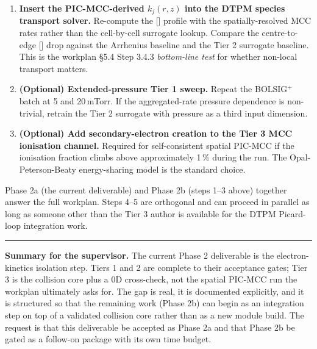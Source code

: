 \documentclass[11pt,a4paper]{article}
\begin{document}
\begin{enumerate}
        fluorine-profile validation. If the centre-to-edge drop
        changes by less than 2 percentage points, the Maxwellian
        Arrhenius baseline stands as adequate for the fluorine
        profile. If it changes by more than that, Tier 2 becomes
        the production kinetics module.
  \item \textbf{Insert the PIC-MCC-derived $k_j(r, z)$ into the
        DTPM species transport solver.} Re-compute the
        [] profile with the spatially-resolved MCC rates
        rather than the cell-by-cell surrogate lookup. Compare the
        centre-to-edge [] drop against the Arrhenius
        baseline and the Tier 2 surrogate baseline. This is the
        workplan §5.4 Step 3.4.3 \emph{bottom-line test} for
        whether non-local transport matters.
  \item \textbf{(Optional) Extended-pressure Tier 1 sweep.} Repeat
        the BOLSIG$^+$ batch at 5 and 20\,mTorr. If the
        aggregated-rate pressure dependence is non-trivial,
        retrain the Tier 2 surrogate with pressure as a third
        input dimension.
  \item \textbf{(Optional) Add secondary-electron creation to the
        Tier 3 MCC ionisation channel.} Required for
        self-consistent spatial PIC-MCC if the ionisation fraction
        climbs above approximately 1\,\% during the run. The
        Opal-Peterson-Beaty energy-sharing model is the standard
        choice.
\end{enumerate}

Phase 2a (the current deliverable) and Phase 2b (steps 1--3 above)
together answer the full workplan. Steps 4--5 are orthogonal and
can proceed in parallel as long as someone other than the Tier 3
author is available for the DTPM Picard-loop integration work.

\vspace{1em}
\hrule
\vspace{0.5em}

\noindent
\textbf{Summary for the supervisor.} The current Phase 2 deliverable
is the electron-kinetics isolation step. Tiers 1 and 2 are complete
to their acceptance gates; Tier 3 is the collision core plus a 0D
cross-check, not the spatial PIC-MCC run the workplan ultimately
asks for. The gap is real, it is documented explicitly, and it is
structured so that the remaining work (Phase 2b) can begin as an
integration step on top of a validated collision core rather than
as a new module build. The request is that this deliverable be
accepted as Phase 2a and that Phase 2b be gated as a follow-on
package with its own time budget.
\end{document}
